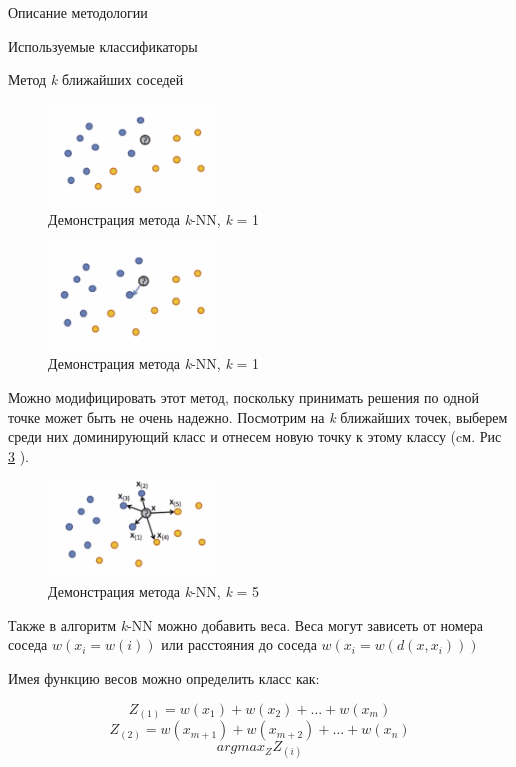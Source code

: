 \begin{section}{Описание методологии}
\begin{subsection}{Используемые классификаторы}
\begin{subsubsection}{Метод \textit{k} ближайших соседей}
\begin{figure}[ht!]
\centering
\includegraphics[width=0.4\textwidth]{pics/knn1}
\caption{Демонстрация метода \textit{k}-NN, \textit{k} = 1}
\label{pic:knn1}
\end{figure}


\begin{figure}[ht!]
\centering
\includegraphics[width=0.4\textwidth]{pics/knn2}
\caption{Демонстрация метода \textit{k}-NN, \textit{k} = 1}
\label{pic:knn2}
\end{figure}

Можно модифицировать этот метод, поскольку принимать решения по одной точке может быть не очень надежно. Посмотрим на \textit{k} ближайших точек, выберем среди них доминирующий класс и отнесем новую точку к этому классу (cм. Рис \ref{pic:knn3} ).

\begin{figure}[ht!]
\centering
\includegraphics[width=0.4\textwidth]{pics/knn3}
\caption{Демонстрация метода \textit{k}-NN, \textit{k} = 5}
\label{pic:knn3}
\end{figure}




Также в алгоритм \textit{k}-NN можно добавить веса. Веса могут зависеть от номера соседа $w(x_{i} = w(i))$ или расстояния до соседа $w(x_{i} = w(d(x, x_{i})))$

Имея функцию весов можно определить класс как:

\begin{equation}
Z_{(1)} = w(x_{1}) + w(x_{2}) + ... + w(x_{m})
\end{equation}
\begin{equation}
Z_{(2)} = w(x_{m + 1}) + w(x_{m + 2}) + ... + w(x_{n})
\end{equation}
\begin{equation}
arg⁡max_Z Z_{(i)}
\end{equation}


\end{subsubsection}
\end{subsection}
\end{section}
